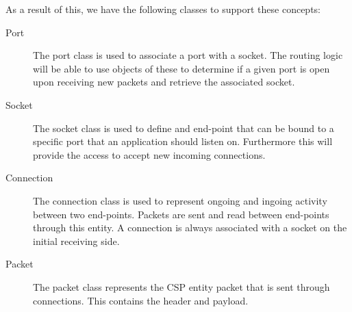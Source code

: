 As a result of this, we have the following classes to support these concepts:
\begin{description}
	\item[Port] The port class is used to associate a port with a socket. The routing logic will be able to use objects of these to determine if a given port is open upon receiving new packets and retrieve the associated socket.
	\item[Socket] The socket class is used to define and end-point that can be bound to a specific port that an application should listen on. Furthermore this will provide the access to accept new incoming connections.
	\item[Connection] The connection class is used to represent ongoing and ingoing activity between two end-points. Packets are sent and read between end-points through this entity. A connection is always associated with a socket on the initial receiving side.
	\item[Packet] The packet class represents the CSP entity packet that is sent through connections. This contains the header and payload.
\end{description}
